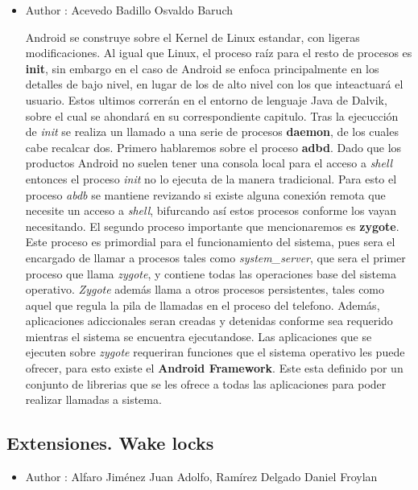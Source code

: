 \documentclass[a4paper]{article}
\begin{document}
\begin{itemize}
\item Author : Acevedo Badillo Osvaldo Baruch\newline

Android se construye sobre el Kernel de Linux estandar, con ligeras modificaciones.
Al igual que Linux, el proceso raíz para el resto de procesos es \textbf{init},
sin embargo en el caso de Android se enfoca principalmente en los detalles de bajo
nivel, en lugar de los de alto nivel con los que inteactuará el usuario. 
Estos ultimos correrán en el entorno de lenguaje Java de Dalvik, sobre el cual se
ahondará en su correspondiente capitulo.\newline
Tras la ejecucción de \textit{init} se realiza un llamado a una serie de procesos
\textbf{daemon}, de los cuales cabe recalcar dos.
Primero hablaremos sobre el proceso \textbf{adbd}. Dado que los productos Android 
no suelen tener una consola local para el acceso a \textit{shell} entonces el 
proceso \textit{init} no lo ejecuta de la manera tradicional. Para esto 
el proceso \textit{abdb} se mantiene revizando si existe alguna conexión 
remota que necesite un acceso a \textit{shell}, bifurcando así estos procesos 
conforme los vayan necesitando.\newline
El segundo proceso importante que mencionaremos es \textbf{zygote}. Este proceso es
primordial para el funcionamiento del sistema, pues sera el encargado de llamar a 
procesos tales como \textit{system\_server}, que sera el primer proceso que llama 
\textit{zygote}, y contiene todas las operaciones base del sistema operativo. 
\textit{Zygote} además llama a otros procesos persistentes, tales como aquel que 
regula la pila de llamadas en el proceso del telefono. Además, aplicaciones
adiccionales seran creadas y detenidas conforme sea requerido mientras el 
sistema se encuentra ejecutandose.\newline
Las aplicaciones que se ejecuten sobre \textit{zygote} requeriran funciones 
que el sistema operativo les puede ofrecer, para esto existe el 
\textbf{Android Framework}. Este esta definido por un conjunto de librerias 
que se les ofrece a todas las aplicaciones para poder realizar llamadas a sistema.


\end{itemize}


\subsection{Extensiones. Wake locks}
\begin{itemize}
\item Author : Alfaro Jiménez Juan Adolfo, Ramírez Delgado Daniel Froylan
\end{itemize}
\end{document}

